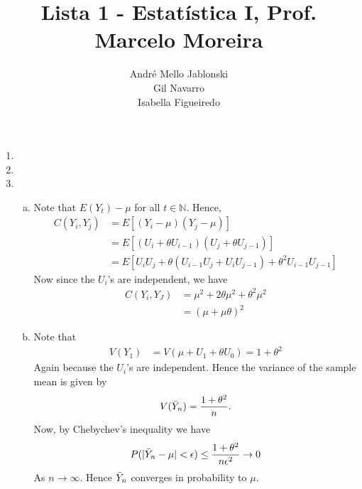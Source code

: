 \documentclass[10pt]{article}
\begin{document}
\title{Lista 1 - Estatística I, Prof. Marcelo Moreira}
\author{André Mello Jablonski \\ Gil Navarro \\ Isabella Figueiredo}

\date{}
\maketitle

\begin{enumerate}

    
\item 


\item 


\item 

\begin{enumerate}[(a)]
    
    \item Note that $E(Y_t) - \mu$ for all $t \in \mathbb{N}.$ Hence, 
    \begin{align*}
        C(Y_i,Y_j) &= E[(Y_i-\mu)(Y_j - \mu)] \\
        &= E[(U_i + \theta U_{i-1})(U_j + \theta U_{j-1})] \\
        &= E[U_iU_j + \theta(U_{i-1}U_j + U_iU_{j-1}) + \theta^2U_{i-1}U_{j-1}]
    \end{align*}
    Now since the $U_i$'s are independent, we have
    \begin{align*}
        C(Y_i,Y_J) &= \mu^2 + 2\theta\mu^2 + \theta^2\mu^2 \\
        &= (\mu + \mu\theta)^2
    \end{align*}
    
    \item Note that 
    \begin{align*}
        V(Y_1) &= V(\mu + U_1 + \theta U_0) = 1 + \theta^2
    \end{align*}
    Again because the $U_i$'s are independent. Hence the variance of the sample mean is given by
    $$V(\Bar{Y}_n) = \dfrac{1+\theta^2}{n}.$$
    Now, by Chebychev's inequality we have 
    $$P(|\Bar{Y}_n - \mu| < \epsilon) \le \dfrac{1+\theta^2}{n\epsilon^2} \rightarrow 0 $$
    As $n \rightarrow \infty.$ Hence $\Bar{Y}_n$ converges in probability to $\mu$.
\end{enumerate}


\end{enumerate}
\end{document}
